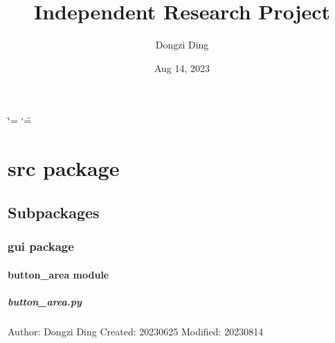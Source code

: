 \documentclass[a4paper,10pt,english]{sphinxmanual}
\title{Independent Research Project}
\date{Aug 14, 2023}
\author{Dongzi Ding}
\begin{document}
\ifdefined\shorthandoff
  \ifnum\catcode`\=\string=\active\shorthandoff{=}\fi
  \ifnum\catcode`\"=\active{}\fi
\fi

\pagestyle{empty}
\sphinxmaketitle
\pagestyle{plain}
\sphinxtableofcontents
\pagestyle{normal}
\label{\detokenize{index::doc}}


\sphinxstepscope


\chapter{src package}
\label{\detokenize{src:module-src}}\label{\detokenize{src:src-package}}\label{\detokenize{src::doc}}

\section{Subpackages}
\label{\detokenize{src:subpackages}}
\sphinxstepscope


\subsection{gui package}
\label{\detokenize{gui:module-src.gui}}\label{\detokenize{gui:gui-package}}\label{\detokenize{gui::doc}}

\subsubsection{button\_area module}
\label{\detokenize{gui:module-src.gui.button_area}}\label{\detokenize{gui:button-area-module}}

\paragraph{button\_area.py}
\label{\detokenize{gui:button-area-py}}
\sphinxAtStartPar
Author: Dongzi Ding
Created: 2023\sphinxhyphen{}06\sphinxhyphen{}25
Modified: 2023\sphinxhyphen{}08\sphinxhyphen{}14
\end{document}
